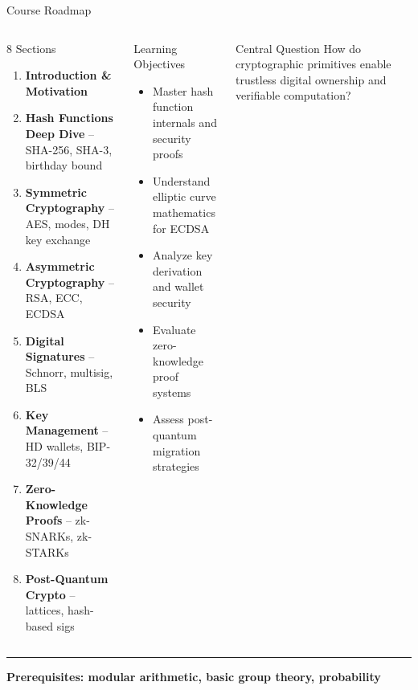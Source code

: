 \documentclass[8pt,aspectratio=169]{beamer}
\newcommand{\bottomnote}[1]{\vfill\vspace{-2mm}\textcolor{mllavender2}{\rule{\textwidth}{0.4pt}}\vspace{1mm}\footnotesize\textbf{#1}}
\begin{document}
\begin{frame}{Course Roadmap}
\begin{columns}
\begin{block}{8 Sections}
\begin{enumerate}\small
  \item \textcolor{mlpurple}{\textbf{Introduction \& Motivation}} \checkmark
  \item \textbf{Hash Functions Deep Dive} -- SHA-256, SHA-3, birthday bound
  \item \textbf{Symmetric Cryptography} -- AES, modes, DH key exchange
  \item \textbf{Asymmetric Cryptography} -- RSA, ECC, ECDSA
  \item \textbf{Digital Signatures} -- Schnorr, multisig, BLS
  \item \textbf{Key Management} -- HD wallets, BIP-32/39/44
  \item \textbf{Zero-Knowledge Proofs} -- zk-SNARKs, zk-STARKs
  \item \textbf{Post-Quantum Crypto} -- lattices, hash-based sigs
\end{enumerate}
\end{block}
\begin{block}{Learning Objectives}
\begin{itemize}\small
  \item Master hash function internals and security proofs
  \item Understand elliptic curve mathematics for ECDSA
  \item Analyze key derivation and wallet security
  \item Evaluate zero-knowledge proof systems
  \item Assess post-quantum migration strategies
\end{itemize}
\end{block}
\vspace{2mm}
\begin{alertblock}{Central Question}
\small How do cryptographic primitives enable trustless digital ownership and verifiable computation?
\end{alertblock}
\end{columns}
\bottomnote{Prerequisites: modular arithmetic, basic group theory, probability}
\end{frame}
\end{document}
